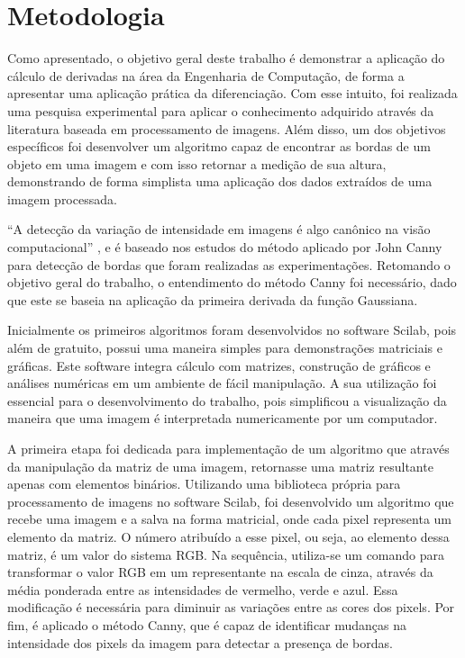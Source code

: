 \documentclass[12pt]{article}
\begin{document}
	
	\section{Metodologia}
	
	Como apresentado, o objetivo geral deste trabalho é demonstrar a aplicação do cálculo de derivadas na área da Engenharia de Computação, de forma a apresentar uma aplicação prática da diferenciação. Com esse intuito, foi realizada uma pesquisa experimental para aplicar o conhecimento adquirido através da literatura baseada em processamento de imagens. Além disso, um dos objetivos específicos foi desenvolver um algoritmo capaz de encontrar as bordas de um objeto em uma imagem e com isso retornar a medição de sua altura, demonstrando de forma simplista uma aplicação dos dados extraídos de uma imagem processada.
	
	“A detecção da variação de intensidade em imagens é algo canônico na visão computacional” \citep{canny1986computational}, e é baseado nos estudos do método aplicado por John Canny para detecção de bordas que foram realizadas as experimentações. Retomando o objetivo geral do trabalho, o entendimento do método Canny foi necessário, dado que este se baseia na aplicação da primeira derivada da função Gaussiana.
	
	
	Inicialmente os primeiros algoritmos foram desenvolvidos no software Scilab, pois além de gratuito, possui uma maneira simples para demonstrações matriciais e gráficas. Este software integra cálculo com matrizes, construção de gráficos e análises numéricas em um ambiente de fácil manipulação. A sua utilização foi essencial para o desenvolvimento do trabalho, pois simplificou a visualização da maneira que uma imagem é interpretada numericamente por um computador.
	
	A primeira etapa foi dedicada para implementação de um algoritmo que através da manipulação da matriz de uma imagem, retornasse uma matriz resultante apenas com elementos binários. Utilizando uma biblioteca própria para processamento de imagens no software Scilab, foi desenvolvido um algoritmo que recebe uma imagem e a salva na forma matricial, onde cada pixel representa um elemento da matriz. O número atribuído a esse pixel, ou seja, ao elemento dessa matriz, é um valor do sistema RGB. Na sequência, utiliza-se um comando para transformar o valor RGB em um representante na escala de cinza, através da média ponderada entre as intensidades de vermelho, verde e azul. Essa modificação é necessária para diminuir as variações entre as cores dos pixels. Por fim, é aplicado o método Canny, que é capaz de identificar mudanças na intensidade dos pixels da imagem para detectar a presença de bordas.
	
\end{document}
